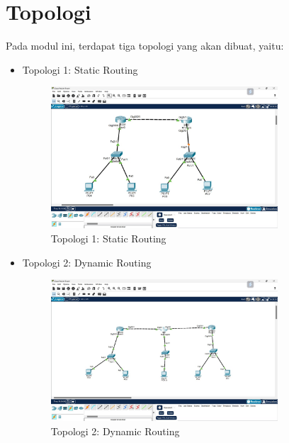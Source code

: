 \section*{Topologi} %

Pada modul ini, terdapat tiga topologi yang akan dibuat, yaitu:

\begin{itemize}
    \item Topologi 1: Static Routing
    \begin{figure}[H]
        \centering
        \includegraphics[width=0.8\textwidth]{img/topo_statis.jpeg}
        \caption{Topologi 1: Static Routing}
        \label{fig:topo1}
    \end{figure}

    \item Topologi 2: Dynamic Routing
    
    \begin{figure}[H]
        \centering
        \includegraphics[width=0.8\textwidth]{img/topo_dinamis.jpeg}
        \caption{Topologi 2: Dynamic Routing}
        \label{fig:topo2}
    \end{figure}
\end{itemize}